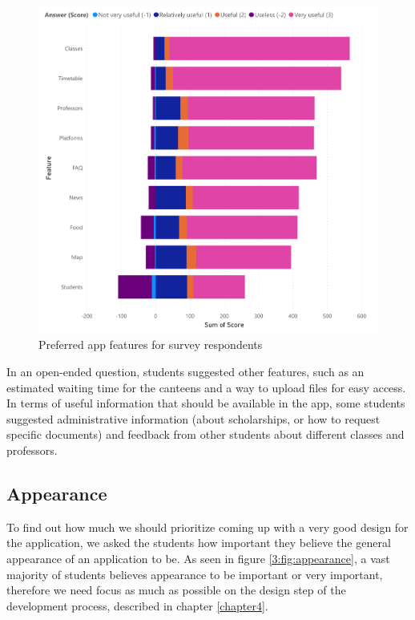 \begin{figure}[ht]
    \centering
         \includegraphics[height=0.57\textheight]{figures/charts/survey/features.pdf}
    \caption{Preferred app features for survey respondents}
    \label{3:fig:features}
\end{figure}

In an open-ended question, students suggested other features, such as an estimated waiting time for the canteens and a way to upload files for easy access. In terms of useful information that should be available in the app, some students suggested administrative information (about scholarships, or how to request specific documents) and feedback from other students about different classes and professors.

\subsection{Appearance} \label{3:appearance}

To find out how much we should prioritize coming up with a very good design for the application, we asked the students how important they believe the general appearance of an application to be. As seen in figure \ref{3:fig:appearance}, a vast majority of students believes appearance to be important or very important, therefore we need focus as much as possible on the design step of the development process, described in chapter \ref{chapter4}.

